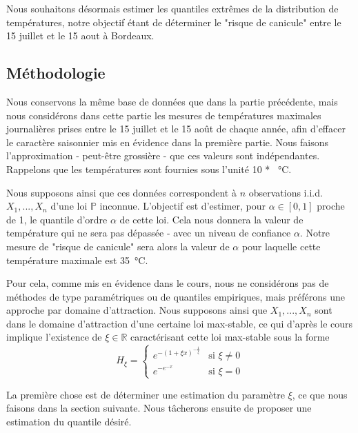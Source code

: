 \documentclass[../report.tex]{subfiles}
\begin{document}
\par Nous souhaitons désormais estimer les quantiles extrêmes de la distribution de températures, notre objectif étant de déterminer le "risque de canicule" entre le 15 juillet et le 15 aout à Bordeaux.


\subsection{Méthodologie}

\par Nous conservons la même base de données que dans la partie précédente, mais nous considérons dans cette partie les mesures de températures maximales journalières prises entre le 15 juillet et le 15 août de chaque année, afin d'effacer le caractère saisonnier mis en évidence dans la première partie. Nous faisons l'approximation - peut-être grossière - que ces valeurs sont indépendantes. Rappelons que les températures sont fournies sous l'unité 10 * \SI{}{\celsius}.

\par Nous supposons ainsi que ces données correspondent à $n$ observations i.i.d. $X_1, ..., X_n$ d'une loi $\mathbb{P}$ inconnue. L'objectif est d'estimer, pour $\alpha \in \left[0, 1 \right]$ proche de 1, le quantile d'ordre $\alpha$ de cette loi. Cela nous donnera la valeur de température qui ne sera pas dépassée - avec un niveau de confiance $\alpha$. Notre mesure de "risque de canicule" sera alors la valeur de $\alpha$ pour laquelle cette température maximale est \SI{35}{\celsius}.

\par Pour cela, comme mis en évidence dans le cours, nous ne considérons pas de méthodes de type paramétriques ou de quantiles empiriques, mais préférons une approche par domaine d'attraction. Nous supposons ainsi que $X_1, ..., X_n$ sont dans le domaine d'attraction d'une certaine loi max-stable, ce qui d'après le cours implique l'existence de $\xi \in \mathbb{R}$ caractérisant cette loi max-stable sous la forme
\begin{displaymath}
H_{\xi} = 
	\begin{cases}
	e^{- {\left( 1 + \xi x \right)}^{-\frac{1}{\xi}}} &\text{si } \xi \neq 0 \\
	e^{-e^{-x}} &\text{si } \xi = 0
	\end{cases}
\end{displaymath}

\par La première chose est de déterminer une estimation du paramètre $\xi$, ce que nous faisons dans la section suivante. Nous tâcherons ensuite de proposer une estimation du quantile désiré.
\end{document}
